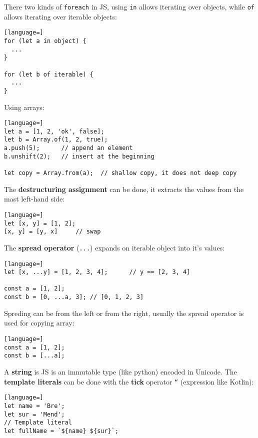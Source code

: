 \documentclass[12pt]{article}
\begin{document}
There two kinds of \texttt{foreach} in JS, using \texttt{in} allows iterating over objects, while \texttt{of} allows iterating over iterable objects:
\begin{lstlisting}[language=]
for (let a in object) {
  ...
}

for (let b of iterable) {
  ...
}
\end{lstlisting}
Using arrays:
\begin{lstlisting}[language=]
let a = [1, 2, 'ok', false];
let b = Array.of(1, 2, true);
a.push(5);      // append an element
b.unshift(2);   // insert at the beginning

let copy = Array.from(a);  // shallow copy, it does not deep copy
\end{lstlisting}
The \textbf{destructuring assignment} can be done, it extracts the values from the mast left-hand side:
\begin{lstlisting}[language=]
let [x, y] = [1, 2];
[x, y] = [y, x]     // swap
\end{lstlisting}
The \textbf{spread operator} (\texttt{...}) expands on iterable object into it's values:
\begin{lstlisting}[language=]
let [x, ...y] = [1, 2, 3, 4];      // y == [2, 3, 4]

const a = [1, 2];
const b = [0, ...a, 3]; // [0, 1, 2, 3]
\end{lstlisting}
Spreding can be from the left or from the right, usually the spread operator is used for copying array:
\begin{lstlisting}[language=]
const a = [1, 2];
const b = [...a];
\end{lstlisting}
A \textbf{string} is JS is an immutable type (like python) encoded in Unicode. The \textbf{template literals} can be done with the \textbf{tick} operator \texttt{``} (expression like Kotlin):
\begin{lstlisting}[language=]
let name = 'Bre';
let sur = 'Mend';
// Template literal
let fullName = `${name} ${sur}`;
\end{lstlisting}
\end{document}
